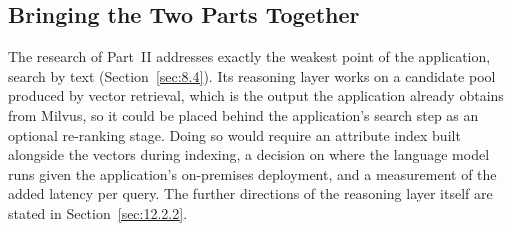 \subsection{Bringing the Two Parts Together}
\label{sec:12.3.2}

The research of Part~II addresses exactly the weakest point of the application, search by text (Section~\ref{sec:8.4}). Its reasoning layer works on a candidate pool produced by vector retrieval, which is the output the application already obtains from Milvus, so it could be placed behind the application's search step as an optional re-ranking stage. Doing so would require an attribute index built alongside the vectors during indexing, a decision on where the language model runs given the application's on-premises deployment, and a measurement of the added latency per query. The further directions of the reasoning layer itself are stated in Section~\ref{sec:12.2.2}.
